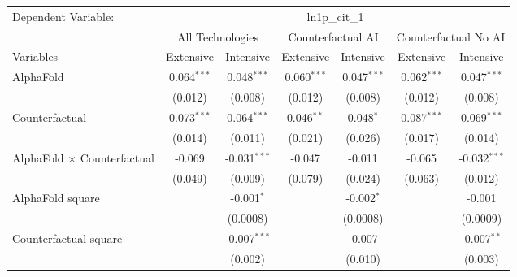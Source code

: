 \begingroup
\centering
\begin{tabular}{lcccccc}
   \tabularnewline \midrule \midrule
   Dependent Variable: & \multicolumn{6}{c}{ln1p\_cit\_1}\\
 & \multicolumn{2}{c}{All Technologies} & \multicolumn{2}{c}{Counterfactual AI} & \multicolumn{2}{c}{Counterfactual No AI} \\
\cmidrule(lr){1-1}\cmidrule(lr){2-3} \cmidrule(lr){4-5} \cmidrule(lr){6-7}
Variables & \multicolumn{1}{c}{Extensive} & \multicolumn{1}{c}{Intensive} & \multicolumn{1}{c}{Extensive} & \multicolumn{1}{c}{Intensive} & \multicolumn{1}{c}{Extensive} & \multicolumn{1}{c}{Intensive} \\
\cmidrule(lr){1-1}\cmidrule(lr){2-2} \cmidrule(lr){3-3} \cmidrule(lr){4-4} \cmidrule(lr){5-5} \cmidrule(lr){6-6} \cmidrule(lr){7-7}
   AlphaFold                          & 0.064$^{***}$ & 0.048$^{***}$  & 0.060$^{***}$ & 0.047$^{***}$ & 0.062$^{***}$ & 0.047$^{***}$\\   
                                      & (0.012)       & (0.008)        & (0.012)       & (0.008)       & (0.012)       & (0.008)\\   
   Counterfactual                     & 0.073$^{***}$ & 0.064$^{***}$  & 0.046$^{**}$  & 0.048$^{*}$   & 0.087$^{***}$ & 0.069$^{***}$\\   
                                      & (0.014)       & (0.011)        & (0.021)       & (0.026)       & (0.017)       & (0.014)\\   
   AlphaFold $\times$ Counterfactual  & -0.069        & -0.031$^{***}$ & -0.047        & -0.011        & -0.065        & -0.032$^{***}$\\   
                                      & (0.049)       & (0.009)        & (0.079)       & (0.024)       & (0.063)       & (0.012)\\   
   AlphaFold square                   &               & -0.001$^{*}$   &               & -0.002$^{*}$  &               & -0.001\\   
                                      &               & (0.0008)       &               & (0.0008)      &               & (0.0009)\\   
   Counterfactual square              &               & -0.007$^{***}$ &               & -0.007        &               & -0.007$^{**}$\\   
                                      &               & (0.002)        &               & (0.010)       &               & (0.003)\\   

\end{tabular}
